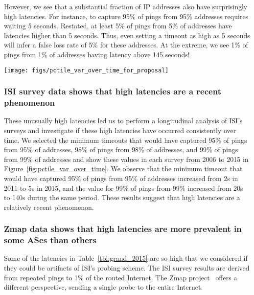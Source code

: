 However, we see that a substantial fraction of IP addresses also have
surprisingly high latencies. For instance, to capture 95\% of pings from 95\%
addresses requires waiting 5 seconds.  Restated, at least 5\% of
pings from 5\% of addresses have latencies higher than 5 seconds. Thus, even
setting a timeout as high as 5 seconds will infer a false loss rate of 5\%
for these addresses. At the extreme, we see 1\% of pings from 1\% of addresses
having latency above 145 seconds!


\begin{figure*}
  \begin{center}
  \texttt{[image: figs/pctile\_var\_over\_time\_for\_proposal]}
  \end{center}
  \caption{\label{fig:pctile_var_over_time}Top: Minimum timeout
    required to capture the $c^{th}$ percentile latency sample from
    the $c^{th}$ percentile address in each survey, organized by time.
    Each point represents the timeout required to capture, e.g., 95\%
    of the responses from 95\% of the addresses.}
\end{figure*}

\subsubsection{ISI survey data shows that high latencies are a recent phenomenon}

These unusually high latencies led us to perform a longitudinal
analysis of ISI's surveys and investigate if these high latencies have
occurred consistently over time. We selected the minimum timeouts that would
have captured 95\% of pings from 95\% of addresses, 98\% of pings from
98\% of addresses, and 99\% of pings from 99\% of addresses and show
these values in each survey from 2006 to 2015 in
Figure~\ref{fig:pctile_var_over_time}. We observe that the minimum
timeout that would have captured 95\% of pings from 95\% of addresses
increased from 2s in 2011 to 5s in 2015, and the value for 99\% of
pings from 99\% increased from 20s to 140s during the same
period. These results suggest that high latencies are a relatively
recent phenomenon. 



\subsubsection{Zmap data shows that high latencies are more prevalent
in some ASes than others}

Some of the latencies in Table~\ref{tbl:grand_2015} are so high that
we considered if they could be artifacts of ISI's probing scheme. The
ISI survey results are derived from repeated pings to 1\% of the
routed Internet. The Zmap project~\cite{durumeric2013zmap} offers a different
perspective, sending a single probe to the entire Internet.


